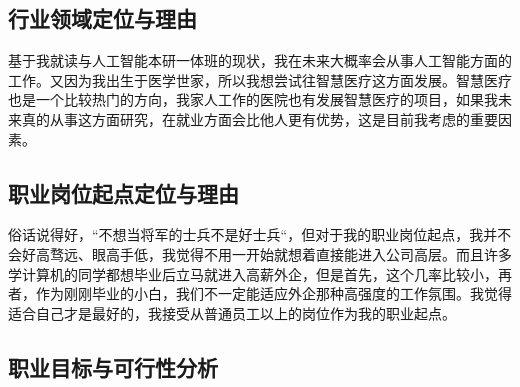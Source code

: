 \documentclass{article}
\begin{document}
\subsection{行业领域定位与理由}
基于我就读与人工智能本研一体班的现状，我在未来大概率会从事人工智能方面的工作。又因为我出生于医学世家，所以我想尝试往智慧医疗这方面发展。智慧医疗也是一个比较热门的方向，我家人工作的医院也有发展智慧医疗的项目，如果我未来真的从事这方面研究，在就业方面会比他人更有优势，这是目前我考虑的重要因素。\par
\subsection{职业岗位起点定位与理由}
俗话说得好，“不想当将军的士兵不是好士兵“，但对于我的职业岗位起点，我并不会好高骛远、眼高手低，我觉得不用一开始就想着直接能进入公司高层。而且许多学计算机的同学都想毕业后立马就进入高薪外企，但是首先，这个几率比较小，再者，作为刚刚毕业的小白，我们不一定能适应外企那种高强度的工作氛围。我觉得适合自己才是最好的，我接受从普通员工以上的岗位作为我的职业起点。\par
\subsection{职业目标与可行性分析}
\par
\end{document}
